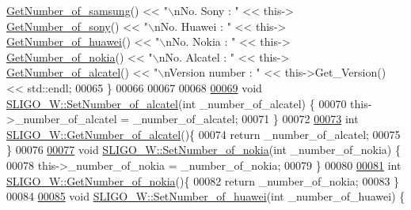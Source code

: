 \begin{DoxyCode}
      \hyperlink{class_s_l_i_g_o___w_aa4b6200a00c2a14924b7ff1ae3896b61}{GetNumber\_of\_samsung}() << \textcolor{stringliteral}{"\(\backslash\)nNo. Sony : "} << this->
      \hyperlink{class_s_l_i_g_o___w_a62822c4fb80f739bee61767238a29e14}{GetNumber\_of\_sony}() << \textcolor{stringliteral}{"\(\backslash\)nNo. Huawei : "} << this->
      \hyperlink{class_s_l_i_g_o___w_a5804f623f4eb290df4f6b3aba59230d6}{GetNumber\_of\_huawei}() << \textcolor{stringliteral}{"\(\backslash\)nNo. Nokia : "} << this->
      \hyperlink{class_s_l_i_g_o___w_a1aa9c9f001b37f3fdcdffae009319298}{GetNumber\_of\_nokia}() << \textcolor{stringliteral}{"\(\backslash\)nNo. Alcatel : "} << this->
      \hyperlink{class_s_l_i_g_o___w_a5afed1018d0629a1e08fc266d05a94d9}{GetNumber\_of\_alcatel}() << \textcolor{stringliteral}{"\(\backslash\)nVersion number : "} << this->Get\_Version() << std::endl;
00065 \}
00066 
00067 
00068 
\hypertarget{_s_l_i_g_o___w_8cpp_source.tex_l00069}{}\hyperlink{class_s_l_i_g_o___w_abbd14fe78b2f5881020630842194aa5b}{00069} \textcolor{keywordtype}{void} \hyperlink{class_s_l_i_g_o___w_abbd14fe78b2f5881020630842194aa5b}{SLIGO\_W::SetNumber\_of\_alcatel}(\textcolor{keywordtype}{int} \_number\_of\_alcatel) \{
00070     this->\_number\_of\_alcatel = \_number\_of\_alcatel;
00071 \}
00072 
\hypertarget{_s_l_i_g_o___w_8cpp_source.tex_l00073}{}\hyperlink{class_s_l_i_g_o___w_a5afed1018d0629a1e08fc266d05a94d9}{00073} \textcolor{keywordtype}{int} \hyperlink{class_s_l_i_g_o___w_a5afed1018d0629a1e08fc266d05a94d9}{SLIGO\_W::GetNumber\_of\_alcatel}()\{
00074     \textcolor{keywordflow}{return} \_number\_of\_alcatel;
00075 \}
00076 
\hypertarget{_s_l_i_g_o___w_8cpp_source.tex_l00077}{}\hyperlink{class_s_l_i_g_o___w_a2b748e4d815e0f2bdb8fb1b0e85b2636}{00077} \textcolor{keywordtype}{void} \hyperlink{class_s_l_i_g_o___w_a2b748e4d815e0f2bdb8fb1b0e85b2636}{SLIGO\_W::SetNumber\_of\_nokia}(\textcolor{keywordtype}{int} \_number\_of\_nokia) \{
00078     this->\_number\_of\_nokia = \_number\_of\_nokia;
00079 \}
00080 
\hypertarget{_s_l_i_g_o___w_8cpp_source.tex_l00081}{}\hyperlink{class_s_l_i_g_o___w_a1aa9c9f001b37f3fdcdffae009319298}{00081} \textcolor{keywordtype}{int} \hyperlink{class_s_l_i_g_o___w_a1aa9c9f001b37f3fdcdffae009319298}{SLIGO\_W::GetNumber\_of\_nokia}()\{
00082     \textcolor{keywordflow}{return} \_number\_of\_nokia;
00083 \}
00084 
\hypertarget{_s_l_i_g_o___w_8cpp_source.tex_l00085}{}\hyperlink{class_s_l_i_g_o___w_a3f770536e7ae43cba203b36b452bca76}{00085} \textcolor{keywordtype}{void} \hyperlink{class_s_l_i_g_o___w_a3f770536e7ae43cba203b36b452bca76}{SLIGO\_W::SetNumber\_of\_huawei}(\textcolor{keywordtype}{int} \_number\_of\_huawei) \{

\end{DoxyCode}
